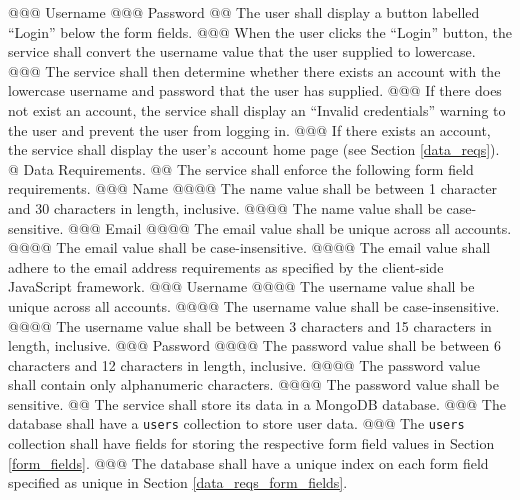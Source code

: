 \documentclass{article}
\begin{document}
\begin{easylist}[articletoc]
  @@@ Username
  @@@ Password
  @@ The user shall display a button labelled ``Login'' below the form fields.
  @@@ When the user clicks the ``Login'' button, the service shall convert the username value that the user supplied to lowercase.
  @@@ The service shall then determine whether there exists an account with the lowercase username and password that the user has supplied.
  @@@ If there does not exist an account, the service shall display an ``Invalid credentials'' warning to the user and prevent the user from logging in.
  @@@ If there exists an account, the service shall display the user's account home page (see Section \ref{data_reqs}).
  @ \label{data_reqs} Data Requirements.
  @@ \label{data_reqs_form_fields} The service shall enforce the following form field requirements.
  @@@ Name
  @@@@ The name value shall be between 1 character and 30 characters in length, inclusive.
  @@@@ The name value shall be case-sensitive.
  @@@ Email
  @@@@ The email value shall be unique across all accounts.
  @@@@ The email value shall be case-insensitive.
  @@@@ The email value shall adhere to the email address requirements as specified by the client-side JavaScript framework.
  @@@ Username
  @@@@ The username value shall be unique across all accounts.
  @@@@ The username value shall be case-insensitive.
  @@@@ The username value shall be between 3 characters and 15 characters in length, inclusive.
  @@@ Password
  @@@@ The password value shall be between 6 characters and 12 characters in length, inclusive.
  @@@@ The password value shall contain only alphanumeric characters.
  @@@@ The password value shall be sensitive.
  @@ The service shall store its data in a MongoDB database.
  @@@ The database shall have a \texttt{users} collection to store user data.
  @@@ The \texttt{users} collection shall have fields for storing the respective form field values in Section \ref{form_fields}.
  @@@ The database shall have a unique index on each form field specified as unique in Section \ref{data_reqs_form_fields}.

\end{easylist}
\end{document}
